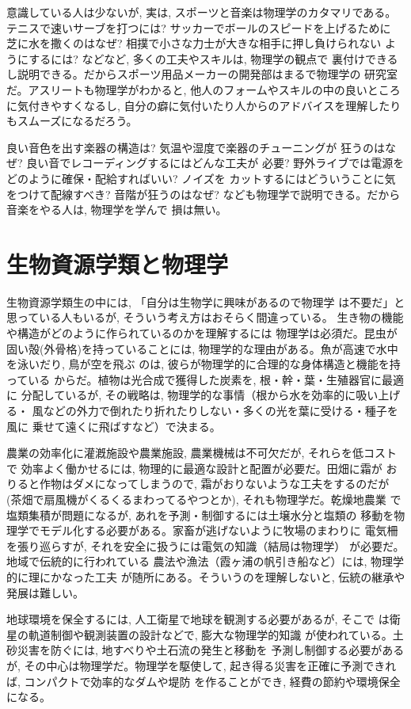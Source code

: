 意識している人は少ないが, 実は, スポーツと音楽は物理学のカタマリである。
テニスで速いサーブを打つには? サッカーでボールのスピードを上げるために
芝に水を撒くのはなぜ? 相撲で小さな力士が大きな相手に押し負けられない
ようにするには? などなど, 多くの工夫やスキルは, 物理学の観点で
裏付けできるし説明できる。だからスポーツ用品メーカーの開発部はまるで物理学の
研究室だ。アスリートも物理学がわかると, 他人のフォームやスキルの中の良いところ
に気付きやすくなるし, 自分の癖に気付いたり人からのアドバイスを理解したり
もスムーズになるだろう。\mv

良い音色を出す楽器の構造は? 気温や湿度で楽器のチューニングが
狂うのはなぜ? 良い音でレコーディングするにはどんな工夫が
必要? 野外ライブでは電源をどのように確保・配給すればいい? ノイズを
カットするにはどういうことに気をつけて配線すべき? 音階が狂うのはなぜ? 
なども物理学で説明できる。だから音楽をやる人は, 物理学を学んで
損は無い。\hv

\section{生物資源学類と物理学}

生物資源学類生の中には, 「自分は生物学に興味があるので物理学
は不要だ」と思っている人もいるが, そういう考え方はおそらく間違っている。
生き物の機能や構造がどのように作られているのかを理解するには
物理学は必須だ。昆虫が固い殻(外骨格)を持っていることには, 
物理学的な理由がある。魚が高速で水中を泳いだり, 鳥が空を飛ぶ
のは, 彼らが物理学的に合理的な身体構造と機能を持っている
からだ。植物は光合成で獲得した炭素を, 根・幹・葉・生殖器官に最適に
分配しているが, その戦略は, 物理学的な事情（根から水を効率的に吸い上げる・
風などの外力で倒れたり折れたりしない・多くの光を葉に受ける・種子を風に
乗せて遠くに飛ばすなど）で決まる。

農業の効率化に灌漑施設や農業施設, 農業機械は不可欠だが, それらを低コストで
効率よく働かせるには, 物理的に最適な設計と配置が必要だ。田畑に霜が
おりると作物はダメになってしまうので, 霜がおりないような工夫をするのだが
(茶畑で扇風機がくるくるまわってるやつとか), それも物理学だ。乾燥地農業
で塩類集積が問題になるが, あれを予測・制御するには土壌水分と塩類の
移動を物理学でモデル化する必要がある。家畜が逃げないように牧場のまわりに
電気柵を張り巡らすが, それを安全に扱うには電気の知識（結局は物理学）
が必要だ。地域で伝統的に行われている
農法や漁法（霞ヶ浦の帆引き船など）には, 物理学的に理にかなった工夫
が随所にある。そういうのを理解しないと, 伝統の継承や発展は難しい。

地球環境を保全するには, 人工衛星で地球を観測する必要があるが, そこで
は衛星の軌道制御や観測装置の設計などで, 膨大な物理学的知識
が使われている。土砂災害を防ぐには, 地すべりや土石流の発生と移動を
予測し制御する必要があるが, その中心は物理学だ。物理学を駆使して, 
起き得る災害を正確に予測できれば, コンパクトで効率的なダムや堤防
を作ることができ, 経費の節約や環境保全になる。

